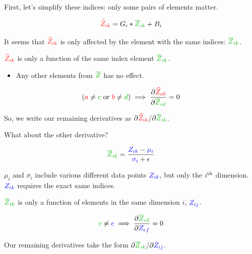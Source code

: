             First, let's simplify these indices: only some pairs of elements matter.

            \begin{equation}
                \red{\widehat{Z}_{ik}} = G_i * \grn{\overline{Z}_{ik}} + B_i
            \end{equation}

            It seems that $\textcolor{red}{\widehat{Z}_{ik}}$ is only affected by the element with the same indices: $\grn{\overline{Z}_{ik}}$.\\

            \begin{concept}
                $\textcolor{red}{\widehat{Z}_{ik}}$  is only a function of the same index element $\grn{\overline{Z}_{ik}}$.

                \begin{itemize}
                    \item Any other elements from $\grn{\overline{Z}}$ has no effect.
                \end{itemize}

                \begin{equation*}
                    (\red{a} \neq \grn{c} \text{ or } \red{b} \neq \grn{d}) \implies 
                    \pderiv{ \red{\widehat{Z}_{ab}} }{ \grn{\overline{Z}_{cd} } }=0
                \end{equation*}

                So, we write our remaining derivatives as $\pderivslash{ \red{\widehat{Z}_{ik}} }{ \grn{\overline{Z}_{ik} } }$.
            \end{concept}
        

            What about the other derivative?

            \begin{equation*}
                \grn{ \overline{Z}_{ik} } =  \frac{ \blu{Z_{ik}}  -\blu{\mu_i}}{ \blu{\sigma_i}+\epsilon}
            \end{equation*}

            $\mu_i$ and $\sigma_i$ include various different data points $\textcolor{blue}{Z_{ik}}$, but only the $i^{ \text{th} }$ dimension. $\textcolor{blue}{Z_{ik}}$ requires the exact same indices.\\

            \begin{concept}
                $\grn{\overline{Z}_{ik}}$ is only a function of elements in the same dimension $i$, $\textcolor{blue}{Z_{ij}}$.

                \begin{equation*}
                    \grn{c} \neq \blu{e} \implies \pderiv{ \grn{\overline{Z}_{cd}} }{ \blu{Z_{ef}} } = 0
                \end{equation*}

                Our remaining derivatives take the form $\pderivslash{ \grn{\overline{Z}_{ik}} }{ \blu{Z_{ij}} }$.
            \end{concept}

